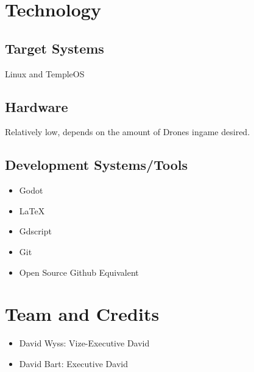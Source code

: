 \documentclass[a4paper]{scrreprt}
\begin{document}
\chapter{Technology}
\section{Target Systems}
    Linux and TempleOS

\section{Hardware}
Relatively low, depends on the amount of Drones ingame desired.

\section{Development Systems/Tools}
\begin{itemize}
	\item Godot
	\item \LaTeX
	\item Gdscript
	\item Git
	\item Open Source Github Equivalent 
\end{itemize}


\chapter{Team and Credits}

\begin{itemize}
    \item David Wyss: Vize-Executive David
    \item David Bart: Executive David
\end{itemize}
\end{document}
